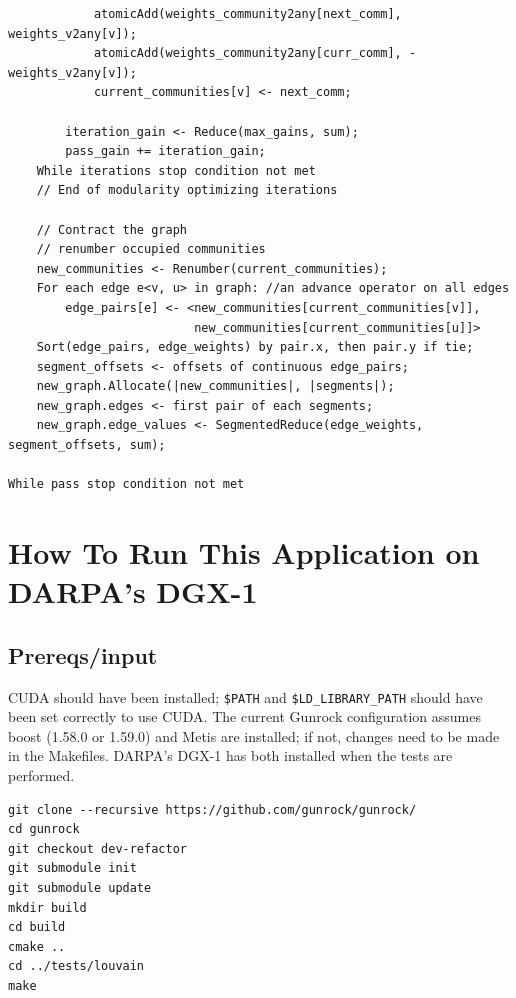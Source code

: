 \documentclass[10pt,oneside]{memoir}
\begin{document}
\begin{verbatim}
            atomicAdd(weights_community2any[next_comm],  weights_v2any[v]);
            atomicAdd(weights_community2any[curr_comm], -weights_v2any[v]);
            current_communities[v] <- next_comm;

        iteration_gain <- Reduce(max_gains, sum);
        pass_gain += iteration_gain;
    While iterations stop condition not met
    // End of modularity optimizing iterations

    // Contract the graph
    // renumber occupied communities
    new_communities <- Renumber(current_communities);
    For each edge e<v, u> in graph: //an advance operator on all edges
        edge_pairs[e] <- <new_communities[current_communities[v]],
                          new_communities[current_communities[u]]>
    Sort(edge_pairs, edge_weights) by pair.x, then pair.y if tie;
    segment_offsets <- offsets of continuous edge_pairs;
    new_graph.Allocate(|new_communities|, |segments|);
    new_graph.edges <- first pair of each segments;
    new_graph.edge_values <- SegmentedReduce(edge_weights, segment_offsets, sum);

While pass stop condition not met
\end{verbatim}

\hypertarget{how-to-run-this-application-on-darpas-dgx-1-4}{%
\section{How To Run This Application on DARPA's
DGX-1}\label{how-to-run-this-application-on-darpas-dgx-1-4}}

\hypertarget{prereqsinput-3}{%
\subsection{Prereqs/input}\label{prereqsinput-3}}

CUDA should have been installed; \texttt{\$PATH} and
\texttt{\$LD\_LIBRARY\_PATH} should have been set correctly to use CUDA.
The current Gunrock configuration assumes boost (1.58.0 or 1.59.0) and
Metis are installed; if not, changes need to be made in the Makefiles.
DARPA's DGX-1 has both installed when the tests are performed.

\begin{verbatim}
git clone --recursive https://github.com/gunrock/gunrock/
cd gunrock
git checkout dev-refactor
git submodule init
git submodule update
mkdir build
cd build
cmake ..
cd ../tests/louvain
make
\end{verbatim}
\end{document}
